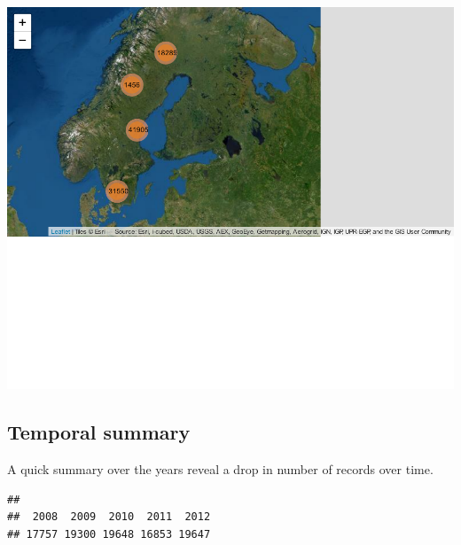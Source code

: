 \documentclass[
  10pt,
]{article}
\newenvironment{Shaded}{\begin{snugshade}}{\end{snugshade}}
\newcommand{\AttributeTok}[1]{\textcolor[rgb]{0.77,0.63,0.00}{#1}}
\newcommand{\FunctionTok}[1]{\textcolor[rgb]{0.00,0.00,0.00}{#1}}
\newcommand{\NormalTok}[1]{#1}
\newcommand{\SpecialCharTok}[1]{\textcolor[rgb]{0.00,0.00,0.00}{#1}}
\newcommand{\StringTok}[1]{\textcolor[rgb]{0.31,0.60,0.02}{#1}}
\begin{document}
\includegraphics{r-tools-tutorial_files/figure-latex/leaflet-1.pdf}

\hypertarget{temporal-summary}{%
\subsection{Temporal summary}\label{temporal-summary}}

A quick summary over the years reveal a drop in number of records over time.

\begin{Shaded}
\end{Shaded}

\begin{verbatim}
## 
##  2008  2009  2010  2011  2012 
## 17757 19300 19648 16853 19647
\end{verbatim}

\begin{Shaded}
\end{Shaded}
\end{document}
